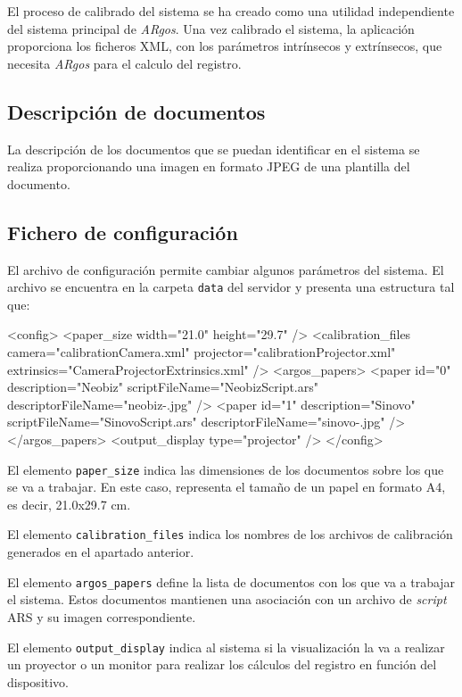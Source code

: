 El proceso de calibrado del sistema se ha creado como una utilidad independiente del sistema
principal de \textit{ARgos}. Una vez calibrado el sistema, la aplicación proporciona los ficheros XML, con
los parámetros intrínsecos y extrínsecos, que necesita \textit{ARgos} para el calculo del registro.

\subsection{Descripción de documentos}

La descripción de los documentos que se puedan identificar en el sistema se realiza proporcionando
una imagen en formato JPEG de una plantilla del documento.

\subsection{Fichero de configuración}

El archivo de configuración permite cambiar algunos parámetros del sistema. El archivo se encuentra
en la carpeta \texttt{data} del servidor y presenta una estructura tal que:

\begin{listing}[%
  language = XML]
<config>
  <paper_size width="21.0" height="29.7" />
  <calibration_files camera="calibrationCamera.xml"
    projector="calibrationProjector.xml"
    extrinsics="CameraProjectorExtrinsics.xml" />
  <argos_papers>
    <paper id="0" description="Neobiz"
      scriptFileName="NeobizScript.ars"
      descriptorFileName="neobiz-.jpg" />
    <paper id="1" description="Sinovo"
      scriptFileName="SinovoScript.ars"
      descriptorFileName="sinovo-.jpg" />
  </argos_papers>
  <output_display type="projector" />
</config>
\end{listing}

El elemento \texttt{paper\_size} indica las dimensiones de los documentos sobre los que se va a
trabajar. En este caso, representa el tamaño de un papel en formato A4, es decir, 21.0x29.7 cm.

El elemento \texttt{calibration\_files} indica los nombres de los archivos de calibración generados
en el apartado anterior.

El elemento \texttt{argos\_papers} define la lista de documentos con los que va a trabajar el
sistema. Estos documentos mantienen una asociación con un archivo de \textit{script} ARS y su
imagen correspondiente.

El elemento \texttt{output\_display} indica al sistema si la visualización la va a realizar un
proyector o un monitor para realizar los cálculos del registro en función del dispositivo.


